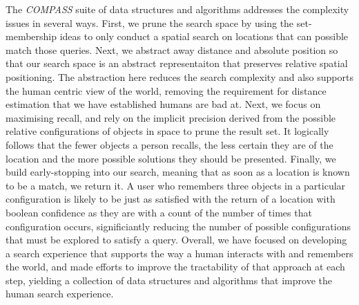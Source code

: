 {The \textit{COMPASS} suite of data structures and algorithms addresses the complexity issues in several ways. First, we prune the search space by using the set-membership ideas to only conduct a spatial search on locations that can possible match those queries. 
Next, we abstract away distance and absolute position so that our search space is an abstract representaiton that preserves relative spatial positioning. 
The abstraction here reduces the search complexity and also supports the human centric view of the world, removing the requirement for distance estimation that we have established humans are bad at. 
Next, we focus on maximising recall, and rely on the implicit precision derived from the possible relative configurations of objects in space to prune the result set. 
It logically follows that the fewer objects a person recalls, the less certain they are of the location and the more possible solutions they should be presented. 
Finally, we build early-stopping into our search, meaning that as soon as a location is known to be a match, we return it.
A user who remembers three objects in a particular configuration is likely to be just as satisfied with the return of a location with boolean confidence as they are with a count of the number of times that configuration occurs, significiantly reducing the number of possible configurations that must be explored to satisfy a query.
Overall, we have focused on developing a search experience that supports the way a human interacts with and remembers the world, and made efforts to improve the tractability of that approach at each step, yielding a collection of data structures and algorithms that improve the human search experience.}

